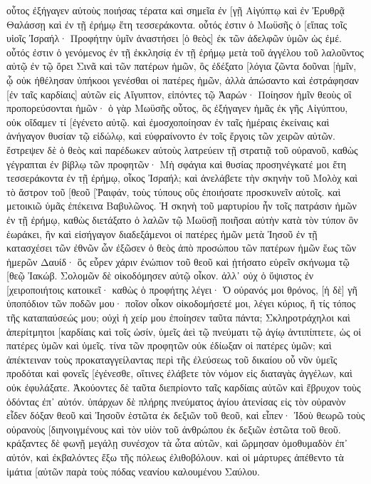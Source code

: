 οὗτος ἐξήγαγεν αὐτοὺς ποιήσας τέρατα καὶ σημεῖα ἐν [γῇ Αἰγύπτῳ καὶ ἐν Ἐρυθρᾷ Θαλάσσῃ καὶ ἐν τῇ ἐρήμῳ ἔτη τεσσεράκοντα. 
οὗτός ἐστιν ὁ Μωϋσῆς ὁ [εἴπας τοῖς υἱοῖς Ἰσραήλ· Προφήτην ὑμῖν ἀναστήσει [ὁ θεὸς] ἐκ τῶν ἀδελφῶν ὑμῶν ὡς ἐμέ. 
οὗτός ἐστιν ὁ γενόμενος ἐν τῇ ἐκκλησίᾳ ἐν τῇ ἐρήμῳ μετὰ τοῦ ἀγγέλου τοῦ λαλοῦντος αὐτῷ ἐν τῷ ὄρει Σινᾶ καὶ τῶν πατέρων ἡμῶν, ὃς ἐδέξατο [λόγια ζῶντα δοῦναι [ἡμῖν, 
ᾧ οὐκ ἠθέλησαν ὑπήκοοι γενέσθαι οἱ πατέρες ἡμῶν, ἀλλὰ ἀπώσαντο καὶ ἐστράφησαν [ἐν ταῖς καρδίαις] αὐτῶν εἰς Αἴγυπτον, 
εἰπόντες τῷ Ἀαρών· Ποίησον ἡμῖν θεοὺς οἳ προπορεύσονται ἡμῶν· ὁ γὰρ Μωϋσῆς οὗτος, ὃς ἐξήγαγεν ἡμᾶς ἐκ γῆς Αἰγύπτου, οὐκ οἴδαμεν τί [ἐγένετο αὐτῷ. 
καὶ ἐμοσχοποίησαν ἐν ταῖς ἡμέραις ἐκείναις καὶ ἀνήγαγον θυσίαν τῷ εἰδώλῳ, καὶ εὐφραίνοντο ἐν τοῖς ἔργοις τῶν χειρῶν αὐτῶν. 
ἔστρεψεν δὲ ὁ θεὸς καὶ παρέδωκεν αὐτοὺς λατρεύειν τῇ στρατιᾷ τοῦ οὐρανοῦ, καθὼς γέγραπται ἐν βίβλῳ τῶν προφητῶν· Μὴ σφάγια καὶ θυσίας προσηνέγκατέ μοι ἔτη τεσσεράκοντα ἐν τῇ ἐρήμῳ, οἶκος Ἰσραήλ; 
καὶ ἀνελάβετε τὴν σκηνὴν τοῦ Μολὸχ καὶ τὸ ἄστρον τοῦ [θεοῦ [Ῥαιφάν, τοὺς τύπους οὓς ἐποιήσατε προσκυνεῖν αὐτοῖς. καὶ μετοικιῶ ὑμᾶς ἐπέκεινα Βαβυλῶνος. 
Ἡ σκηνὴ τοῦ μαρτυρίου ἦν τοῖς πατράσιν ἡμῶν ἐν τῇ ἐρήμῳ, καθὼς διετάξατο ὁ λαλῶν τῷ Μωϋσῇ ποιῆσαι αὐτὴν κατὰ τὸν τύπον ὃν ἑωράκει, 
ἣν καὶ εἰσήγαγον διαδεξάμενοι οἱ πατέρες ἡμῶν μετὰ Ἰησοῦ ἐν τῇ κατασχέσει τῶν ἐθνῶν ὧν ἐξῶσεν ὁ θεὸς ἀπὸ προσώπου τῶν πατέρων ἡμῶν ἕως τῶν ἡμερῶν Δαυίδ· 
ὃς εὗρεν χάριν ἐνώπιον τοῦ θεοῦ καὶ ᾐτήσατο εὑρεῖν σκήνωμα τῷ [θεῷ Ἰακώβ. 
Σολομῶν δὲ οἰκοδόμησεν αὐτῷ οἶκον. 
ἀλλ᾽ οὐχ ὁ ὕψιστος ἐν [χειροποιήτοις κατοικεῖ· καθὼς ὁ προφήτης λέγει· 
Ὁ οὐρανός μοι θρόνος, [ἡ δὲ] γῆ ὑποπόδιον τῶν ποδῶν μου· ποῖον οἶκον οἰκοδομήσετέ μοι, λέγει κύριος, ἢ τίς τόπος τῆς καταπαύσεώς μου; 
οὐχὶ ἡ χείρ μου ἐποίησεν ταῦτα πάντα; 
Σκληροτράχηλοι καὶ ἀπερίτμητοι [καρδίαις καὶ τοῖς ὠσίν, ὑμεῖς ἀεὶ τῷ πνεύματι τῷ ἁγίῳ ἀντιπίπτετε, ὡς οἱ πατέρες ὑμῶν καὶ ὑμεῖς. 
τίνα τῶν προφητῶν οὐκ ἐδίωξαν οἱ πατέρες ὑμῶν; καὶ ἀπέκτειναν τοὺς προκαταγγείλαντας περὶ τῆς ἐλεύσεως τοῦ δικαίου οὗ νῦν ὑμεῖς προδόται καὶ φονεῖς [ἐγένεσθε, 
οἵτινες ἐλάβετε τὸν νόμον εἰς διαταγὰς ἀγγέλων, καὶ οὐκ ἐφυλάξατε. 
Ἀκούοντες δὲ ταῦτα διεπρίοντο ταῖς καρδίαις αὐτῶν καὶ ἔβρυχον τοὺς ὀδόντας ἐπ᾽ αὐτόν. 
ὑπάρχων δὲ πλήρης πνεύματος ἁγίου ἀτενίσας εἰς τὸν οὐρανὸν εἶδεν δόξαν θεοῦ καὶ Ἰησοῦν ἑστῶτα ἐκ δεξιῶν τοῦ θεοῦ, 
καὶ εἶπεν· Ἰδοὺ θεωρῶ τοὺς οὐρανοὺς [διηνοιγμένους καὶ τὸν υἱὸν τοῦ ἀνθρώπου ἐκ δεξιῶν ἑστῶτα τοῦ θεοῦ. 
κράξαντες δὲ φωνῇ μεγάλῃ συνέσχον τὰ ὦτα αὐτῶν, καὶ ὥρμησαν ὁμοθυμαδὸν ἐπ᾽ αὐτόν, 
καὶ ἐκβαλόντες ἔξω τῆς πόλεως ἐλιθοβόλουν. καὶ οἱ μάρτυρες ἀπέθεντο τὰ ἱμάτια [αὐτῶν παρὰ τοὺς πόδας νεανίου καλουμένου Σαύλου. 
